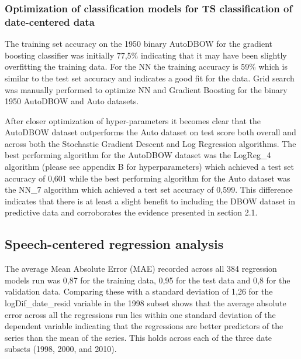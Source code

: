 \documentclass[11pt,preprint, authoryear]{elsarticle}
\numberwithin{equation}{section}
\numberwithin{figure}{section}
\numberwithin{table}{section}
\begin{document}
\hypertarget{optimization-of-classification-models-for-ts-classification-of-date-centered-data}{%
\subsubsection{Optimization of classification models for TS
classification of date-centered
data}\label{optimization-of-classification-models-for-ts-classification-of-date-centered-data}}

The training set accuracy on the 1950 binary AutoDBOW for the gradient
boosting classifier was initially 77,5\% indicating that it may have
been slightly overfitting the training data. For the NN the training
accuracy is 59\% which is similar to the test set accuracy and indicates
a good fit for the data. Grid search was manually performed to optimize
NN and Gradient Boosting for the binary 1950 AutoDBOW and Auto datasets.

After closer optimization of hyper-parameters it becomes clear that the
AutoDBOW dataset outperforms the Auto dataset on test score both overall
and across both the Stochastic Gradient Descent and Log Regression
algorithms. The best performing algorithm for the AutoDBOW dataset was
the LogReg\_4 algorithm (please see appendix B for hyperparameters)
which achieved a test set accuracy of 0,601 while the best performing
algorithm for the Auto dataset was the NN\_7 algorithm which achieved a
test set accuracy of 0,599. This difference indicates that there is at
least a slight benefit to including the DBOW dataset in predictive data
and corroborates the evidence presented in section 2.1.

\hypertarget{speech-centered-regression-analysis}{%
\subsection{Speech-centered regression
analysis}\label{speech-centered-regression-analysis}}

The average Mean Absolute Error (MAE) recorded across all 384 regression
models run was 0,87 for the training data, 0,95 for the test data and
0,8 for the validation data. Comparing these with a standard deviation
of 1,26 for the logDif\_date\_resid variable in the 1998 subset shows
that the average absolute error across all the regressions run lies
within one standard deviation of the dependent variable indicating that
the regressions are better predictors of the series than the mean of the
series. This holds across each of the three date subsets (1998, 2000,
and 2010).
\end{document}

